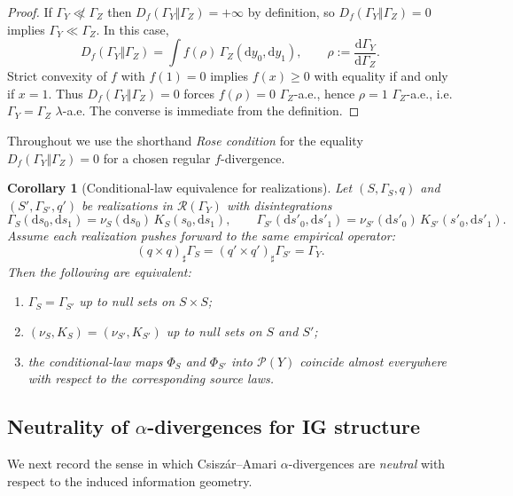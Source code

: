 \documentclass[11pt]{article}
\newtheorem{corollary}{Corollary}
\begin{document}
\begin{proof}
If $\Gamma_Y\not\ll\Gamma_Z$ then $D_f(\Gamma_Y\Vert\Gamma_Z)=+\infty$
by definition, so $D_f(\Gamma_Y\Vert\Gamma_Z)=0$ implies
$\Gamma_Y\ll\Gamma_Z$. In this case,
\[
  D_f(\Gamma_Y\Vert\Gamma_Z)
  = \int f(\rho)\,\Gamma_Z(\mathrm dy_0,\mathrm dy_1),
  \qquad
  \rho := \frac{\mathrm d\Gamma_Y}{\mathrm d\Gamma_Z}.
\]
Strict convexity of $f$ with $f(1)=0$ implies $f(x)\ge 0$ with equality
if and only if $x=1$. Thus $D_f(\Gamma_Y\Vert\Gamma_Z)=0$ forces
$f(\rho)=0$ $\Gamma_Z$-a.e., hence $\rho=1$ $\Gamma_Z$-a.e., i.e.
$\Gamma_Y=\Gamma_Z$ $\lambda$-a.e. The converse is immediate from the
definition.
\end{proof}

Throughout we use the shorthand \emph{Rose condition} for the equality
$D_f(\Gamma_Y\Vert\Gamma_Z)=0$ for a chosen regular $f$-divergence.

\begin{corollary}[Conditional-law equivalence for realizations]
\label{cor:conditional-law-equivalence}
Let $(S,\Gamma_S,q)$ and $(S',\Gamma_{S'},q')$ be realizations in
$\mathcal{R}(\Gamma_Y)$ with disintegrations
\[
  \Gamma_S(\mathrm ds_0,\mathrm ds_1)
    = \nu_S(\mathrm ds_0)\,K_S(s_0,\mathrm ds_1),\qquad
  \Gamma_{S'}(\mathrm ds'_0,\mathrm ds'_1)
    = \nu_{S'}(\mathrm ds'_0)\,K_{S'}(s'_0,\mathrm ds'_1).
\]
Assume each realization pushes forward to the same empirical operator:
\[
  (q\times q)_{\sharp}\Gamma_S
  = (q'\times q')_{\sharp}\Gamma_{S'}
  = \Gamma_Y.
\]
Then the following are equivalent:
\begin{enumerate}[label=(\roman*),leftmargin=1.8em]
  \item $\Gamma_S = \Gamma_{S'}$ up to null sets on $S\times S$;
  \item $(\nu_S,K_S) = (\nu_{S'},K_{S'})$ up to null sets on $S$ and $S'$;
  \item the conditional-law maps $\Phi_S$ and $\Phi_{S'}$ into
  $\mathcal{P}(Y)$ coincide almost everywhere with respect to the
  corresponding source laws.
\end{enumerate}
\end{corollary}

\subsection{Neutrality of $\alpha$-divergences for IG structure}

We next record the sense in which Csiszár--Amari $\alpha$-divergences
are \emph{neutral} with respect to the induced information geometry.
\end{document}
